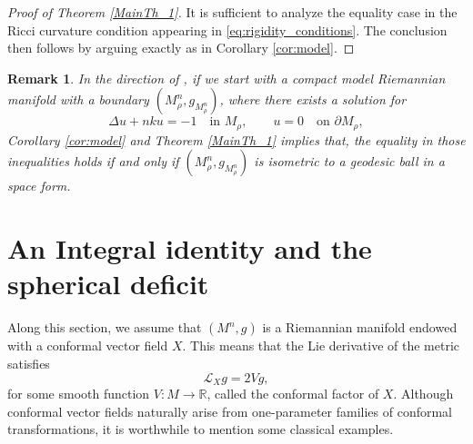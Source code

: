 \documentclass[reqno,11pt]{amsart}
\numberwithin{equation}{section}  %
\newtheorem{remark}[theorem]{Remark}
\begin{document}
\begin{proof}[Proof of Theorem \ref{MainTh_1}]
It is sufficient to analyze the equality case in the Ricci curvature condition appearing in \eqref{eq:rigidity_conditions}. The conclusion then follows by arguing exactly as in Corollary \ref{cor:model}.
\end{proof}

\begin{remark}
 In the direction of \cite[Theorem 1.7]{wang2020}, if we start with a compact model Riemannian manifold with a boundary $(M_{\rho}^{n},g_{M_{\rho}^{n}})$, where there exists a solution for 
 \begin{equation}\label{Dirichlet3}
\Delta u + n k u = -1 \quad \text{in } M_{\rho}, 
\qquad 
u = 0 \quad \text{on } \partial M_{\rho},
\end{equation}
Corollary \ref{cor:model} and Theorem \ref{MainTh_1} implies that, the equality in those inequalities holds if and only if $(M_{\rho}^{n},g_{M_{\rho}^{n}})$ is isometric to a geodesic ball in a space form.
\end{remark}


\section{An Integral identity and the spherical deficit}\label{sec_deficit}

Along this section, we assume that $(M^{n},g)$ is a Riemannian manifold endowed with a conformal vector field $X$. This means that the Lie derivative of the metric satisfies
\[
\mathcal{L}_{X}g = 2Vg,
\]
for some smooth function $V\colon M\to\mathbb{R}$, called the conformal factor of $X$. Although conformal vector fields naturally arise from one-parameter families of conformal transformations, it is worthwhile to mention some classical examples.
\end{document}
